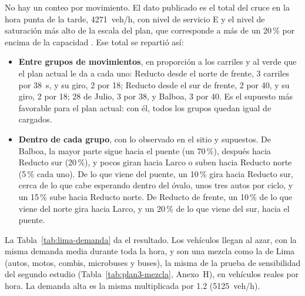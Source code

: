 No hay un conteo por movimiento. El dato publicado es el total del
cruce en la hora punta de la tarde, 4271~veh/h, con nivel de servicio E
y el nivel de saturación más alto de la escala del plan, que
corresponde a más de un 20\,\% por encima de la capacidad
\citep{Miraflores2017_PMU}. Ese total se repartió así:
\begin{itemize}
  \item \textbf{Entre grupos de movimientos}, en proporción a los
    carriles y al verde que el plan actual le da a cada uno: Reducto
    desde el norte de frente, 3 carriles por 38~s, y su giro, 2 por 18;
    Reducto desde el sur de frente, 2 por 40, y su giro, 2 por 18; 28 de
    Julio, 3 por 38, y Balboa, 3 por 40. Es el supuesto más favorable
    para el plan actual: con él, todos los grupos quedan igual de
    cargados.
  \item \textbf{Dentro de cada grupo}, con lo observado en el sitio y
    supuestos. De Balboa, la mayor parte sigue hacia el puente (un
    70\,\%), después hacia Reducto sur (20\,\%), y pocos giran hacia
    Larco o suben hacia Reducto norte (5\,\% cada uno). De lo que viene
    del puente, un 10\,\% gira hacia Reducto sur, cerca de lo que cabe
    esperando dentro del óvalo, unos tres autos por ciclo, y un
    15\,\% sube hacia Reducto norte. De Reducto de frente, un 10\,\% de
    lo que viene del norte gira hacia Larco, y un 20\,\% de lo que viene
    del sur, hacia el puente.
\end{itemize}
La Tabla~\ref{tab:lima-demanda} da el resultado. Los vehículos llegan al
azar, con la misma demanda media durante toda la hora, y son una mezcla
como la de Lima (autos, motos, combis, microbuses y buses), la misma de
la prueba de sensibilidad del segundo estudio (Tabla~\ref{tab:plan3-mezcla}, Anexo~H), en vehículos reales por hora. La demanda
alta es la misma multiplicada por 1.2 (5125~veh/h).

